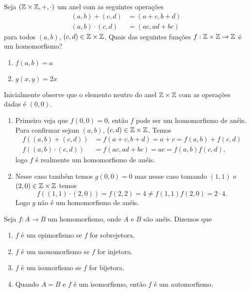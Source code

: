 \begin{exemplo}
    Seja $(\mathbb{Z}\times\mathbb{Z}, +, \cdot)$ um anel com as seguintes operações
    \begin{align*}
        (a, b) + (c, d) &= (a + c, b + d)\\
        (a, b)\cdot (c, d) &= (ac, ad + bc)
    \end{align*}
    para todos $(a, b)$, $(c, d) \in \mathbb{Z}\times\mathbb{Z}$.
    Quais das seguintes funções $f : \mathbb{Z}\times\mathbb{Z} \to \mathbb{Z}$ é um homomorfismo?
    \begin{enumerate}[label={\alph*})]
        \item $f(a, b) = a$

        \item $g(x, y) = 2x$
    \end{enumerate}
    \begin{solucao}
        Inicialmente observe que o elemento neutro do anel $\mathbb{Z} \times \mathbb{Z}$ com as operações dadas é $(0, 0)$.
        \begin{enumerate}[label={\alph*})]
            \item Primeiro veja que $f(0, 0) = 0$, então $f$ pode ser um homomorfismo de anéis. Para confirmar sejam $(a, b)$, $(c, d) \in \mathbb{Z} \times \mathbb{Z}$. Temos
                \begin{align*}
                    f((a, b) + (c, d)) &= f(a + c, b + d) = a + c = f(a, b) + f(c, d)\\
                    f((a, b) \cdot (c, d)) &= f(ac, ad + bc) = ac = f(a, b)f(c, d),
                \end{align*}
                logo $f$ é realmente um homomorfismo de anéis.

            \item Nesse caso também temos $g(0, 0) = 0$ mas nesse caso tomando $(1, 1)$ e $(2,0) \in \mathbb{Z} \times \mathbb{Z}$ temos
                \[
                    f((1, 1) \cdot (2, 0)) = f(2, 2) = 4 \ne f(1,1)f(2,0)=2\cdot 4.
                \]
                Logo $g$ não é um homomorfismo de anéis.
        \end{enumerate}
    \end{solucao}
\end{exemplo}


\begin{definicao}Seja $f:A\rightarrow B$ um homomorfismo, onde $A$ e $B$ são anéis. Dizemos que
    \begin{enumerate}[label={\roman*})]
        \item $f$ é um epimorfismo se $f$ for sobrejetora.
        \item $f$ é um monomorfismo se $f$ for injetora.
        \item $f$ é um isomorfismo se $f$ for bijetora.
        \item Quando $A=B$ e $f$ é um isomorfismo, então $f$ é um automorfismo.
    \end{enumerate}
\end{definicao}


